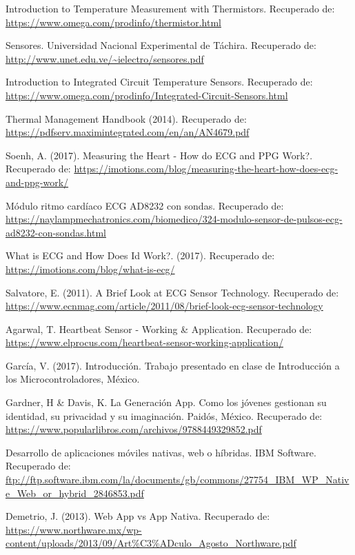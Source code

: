\begin{thebibliography}{0}
	 Introduction to Temperature Measurement with Thermistors. Recuperado de: \url{https://www.omega.com/prodinfo/thermistor.html}
	
	 Sensores. Universidad Nacional Experimental de Táchira. Recuperado de: \url{http://www.unet.edu.ve/~ielectro/sensores.pdf}
	
	 Introduction to Integrated Circuit Temperature Sensors. Recuperado de: \url{https://www.omega.com/prodinfo/Integrated-Circuit-Sensors.html}
	
	 Thermal Management Handbook (2014). Recuperado de: \url{https://pdfserv.maximintegrated.com/en/an/AN4679.pdf}
	
	 Soenh, A. (2017). Measuring the Heart - How do ECG and PPG Work?. Recuperado de: \url{https://imotions.com/blog/measuring-the-heart-how-does-ecg-and-ppg-work/}
	
	 Módulo ritmo cardíaco ECG AD8232 con sondas. Recuperado de: \url{https://naylampmechatronics.com/biomedico/324-modulo-sensor-de-pulsos-ecg-ad8232-con-sondas.html}
	
	 What is ECG and How Does Id Work?. (2017). Recuperado de: \url{https://imotions.com/blog/what-is-ecg/}
	
	 Salvatore, E. (2011). A Brief Look at ECG Sensor Technology. Recuperado de: \url{https://www.ecnmag.com/article/2011/08/brief-look-ecg-sensor-technology}
	
	 Agarwal, T. Heartbeat Sensor - Working \& Application. Recuperado de: \url{https://www.elprocus.com/heartbeat-sensor-working-application/}
	
	 García, V. (2017). Introducción. Trabajo presentado en clase de Introducción a los Microcontroladores, México.
	
	 Gardner, H \& Davis, K. La Generación App. Como los jóvenes gestionan su identidad, su privacidad y su imaginación. Paidós, México. Recuperado de: \url{https://www.popularlibros.com/archivos/9788449329852.pdf}
	
	 Desarrollo de aplicaciones móviles nativas, web o híbridas. IBM Software. Recuperado de: \url{ftp://ftp.software.ibm.com/la/documents/gb/commons/27754_IBM_WP_Native_Web_or_hybrid_2846853.pdf}
	
	 Demetrio, J. (2013). Web App vs App Nativa. Recuperado de: \url{https://www.northware.mx/wp-content/uploads/2013/09/Art%C3%ADculo_Agosto_Northware.pdf}
		

\end{thebibliography}
